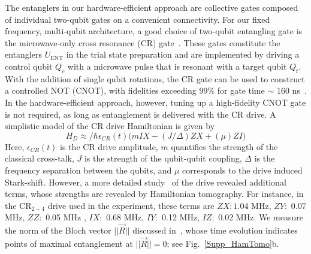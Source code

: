 \documentclass[twocolumn]{revtex4-1}
\newcommand{\1}{\mathbbm{1}}
\begin{document}
The entanglers in our hardware-efficient approach are collective gates composed of individual two-qubit gates on a convenient connectivity.
For our fixed frequency, multi-qubit architecture, a good choice of two-qubit entangling gate is the microwave-only cross resonance (CR) gate~\cite{Paraoanu2006S,Rigetti2010S,Chow2011S}. These gates constitute the entanglers $U_{\textrm{ENT}}$ in the trial state preparation and are implemented by driving a control qubit $Q_c$ with a microwave pulse that is resonant with a target qubit $Q_t$. With the addition of single qubit rotations, the CR gate can be used to construct a controlled NOT (CNOT), with fidelities exceeding $99\%$ for gate time $\sim$ 160 ns~\cite{Sheldon2016S}. In the hardware-efficient approach, however, tuning up a high-fidelity CNOT gate is not required, as long as entanglement is delivered with the CR drive. A simplistic model of the CR drive Hamiltonian is given by 
\begin{equation}
H_D\approx/\hbar\epsilon_{CR}(t)\Big(mIX-(J/\Delta)ZX+(\mu)ZI\Big)
\end{equation}
Here, $\epsilon_{CR}(t)$ is the CR drive amplitude, $m$ quantifies the strength of the classical cross-talk, $J$ is the strength of the qubit-qubit coupling, $\Delta$ is the frequency separation between the qubits, and $\mu$ corresponds to the drive induced Stark-shift. However, a more detailed study~\cite{Sheldon2016S} of the drive revealed additional terms, whose strengths are revealed by Hamiltonian tomography. For instance, in the CR$_{2-4}$ drive used in the experiment, these terms are $ZX: 1.04$ MHz, $ZY:$ 0.07 MHz,  $ZZ:$ 0.05 MHz , $IX:$ 0.68 MHz, $IY:$ 0.12 MHz, $IZ:$ 0.02 MHz. We measure the norm of the Bloch vector $||\vec{R}||$ discussed in~\cite{Sheldon2016S}, whose time evolution indicates points of maximal entanglement at $||\vec{R}||=0$; see Fig.~\ref{Supp_HamTomo}b. 
\end{document}
